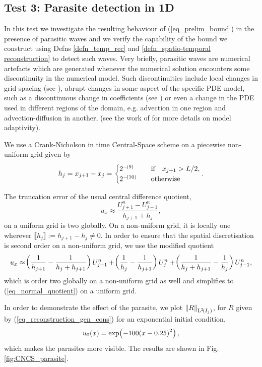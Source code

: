 \documentclass[final]{amsart}
\numberwithin{equation}{section}
\begin{document}
\subsection{Test 3: Parasite detection in 1D} \label{subsec:parasite}In this test we investigate the resulting behaviour of (\ref{eq_prelim_bound}) in the presence of parasitic waves and we verify the capability of the bound we construct using Defns \ref{defn_temp_rec} and \ref{defn_spatio-temporal reconstruction} to detect such waves. Very briefly, parasitic waves are numerical artefacts which are generated whenever the numerical solution encounters some discontinuity in the numerical model. Such discontinuities include local changes in grid spacing (see \cite{vichnevetsky1981propagation}),  abrupt changes in some aspect of the specific PDE model, such as a discontinuous change in coefficients (see \cite{trefethen1982group}) or even a change in the PDE used in different regions of the domain, e.g. advection in one region and advection-diffusion in another, (see the work of \cite{giesselmann2017posteriori} for more details on model adaptivity).  

We use a Crank-Nicholson in time  Central-Space scheme  on a piecewise non-uniform grid given by
\begin{equation}\label{eq_grid_spacing_piecewise_nonu}
h_j=x_{j+1}-x_j= \begin{cases}
2^{-\!\left({9}\right)} \quad&\text{if}\quad x_{j+1}>L/2,\\
2^{-\!\left({10}\right)}\quad&\text{otherwise}
\end{cases}.
\end{equation}


\begin{Rem}\label{rem_central_truncation}
	The truncation error of the usual central difference quotient,
	\begin{equation}\label{eq_normal_quotient}
	u_x\approx \frac{U^n_{j+1}-U^n_{j-1}}{h_{j+1}+h_{j}},
	\end{equation}
	on a uniform grid is two globally. On a non-uniform grid, it is locally one wherever $\llbracket h_j\rrbracket:= h_{j+1}-h_{j}\neq 0$.  In order to ensure that the spatial discretisation is second order on a non-uniform grid, we use the modified  quotient 
	\begin{equation}\label{eq_modified_quotient}
	u_x \approx \!\left({\frac{1}{h_{j+1}} - \frac{1}{h_j+h_{j+1} } }\right)U^n_{j+1} + 
	\!\left({\frac{1}{h_{j}} - \frac{1}{h_{j+1} } }\right)U^n_{j} +
	\!\left({\frac{1}{h_j+h_{j+1} } -\frac{1}{h_{j}} }\right)U^n_{j-1},
	\end{equation}
	which is order two globally  on a non-uniform grid as well and simplifies to (\ref{eq_normal_quotient}) on a uniform grid. 
\end{Rem}
In order to demonstrate the effect of the parasite, we plot $\left\|R\right\|_{\operatorname L^{2}\!\left({I_j}\right)}$, for $R$ given by  (\ref{eq_reconstruction_gen_cons}) for  an exponential initial condition, 
\begin{equation}\label{eq_ic_parasites}
u_0\!\left({x}\right)=\exp\!\left({-100\!\left({x-0.25}\right)^2}\right),
\end{equation}
which makes the parasites more visible.  The results are shown in Fig. \ref{fig:CNCS_parasite}.
\end{document}
